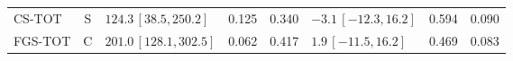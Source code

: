 \documentclass[10pt,a4paper]{article}
\begin{document}
\begin{longtable}{lcp{37mm}rrp{37mm}rr}
CS-TOT & S & \(124.3\,[38.5,250.2]\) & 0.125 & 0.340 & \(-3.1\,[-12.3,16.2]\) & 0.594 & 0.090\\
FGS-TOT & C & \(201.0\,[128.1,302.5]\) & 0.062 & 0.417 & \(1.9\,[-11.5,16.2]\) & 0.469 & 0.083\\

\end{longtable}
\end{document}

